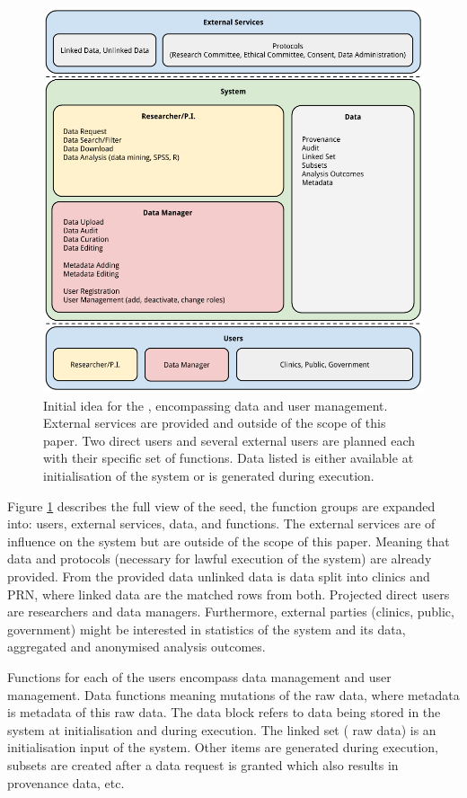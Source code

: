 \begin{figure}[t]
	\centering
	\includegraphics[width=1.0\linewidth]{images/brainstorm-before}
	\caption{
		Initial idea for the \ivfsystem{}, encompassing data and user management.
		External services are provided and outside of the scope of this paper.
		Two direct users and several external users are planned each with their specific set of functions.
		Data listed is either available at initialisation of the system or is generated during execution.
	}
	\label{fig:brainstorm-before}
\end{figure}

Figure \ref{fig:brainstorm-before} describes the full view of the seed, the function groups are expanded into: users, external services, data, and functions.
The external services are of influence on the system but are outside of the scope of this paper.
Meaning that data and protocols (necessary for lawful execution of the system) are already provided.
From the provided data unlinked data is \project{} data split into clinics and PRN, where linked data are the matched rows from both.
Projected direct users are researchers and data managers.
Furthermore, external parties (clinics, public, government) might be interested in statistics of the system and its data, \eg{} aggregated and anonymised analysis outcomes.

Functions for each of the users encompass data management and user management.
Data functions meaning mutations of the raw \project{} data, where metadata is metadata of this raw data.
The data block refers to data being stored in the system at initialisation and during execution.
The linked set (\ie{} raw data) is an initialisation input of the system.
Other items are generated during execution, \eg{} subsets are created after a data request is granted which also results in provenance data, etc.